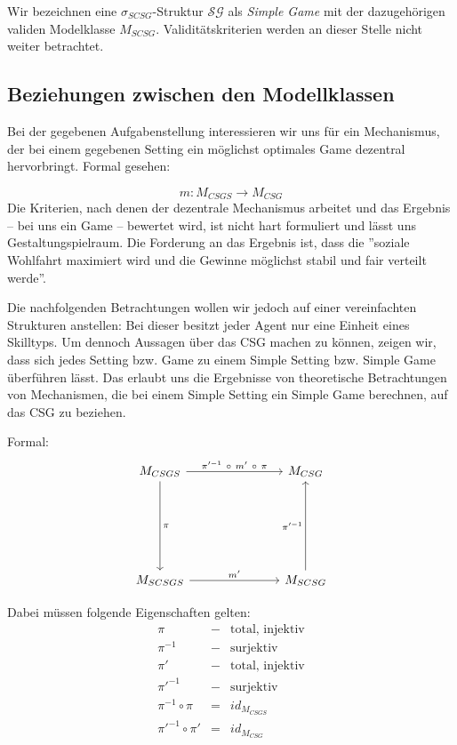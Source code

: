 \documentclass[sigconf]{acmart}
\theoremstyle{break}
\begin{document}
\noindent
Wir bezeichnen eine $\sigma_{SCSG}$-Struktur $\mathcal{SG}$ als \textit{Simple Game} mit der dazugehörigen validen Modelklasse $M_{SCSG}$. Validitätskriterien werden an dieser Stelle nicht weiter betrachtet.


\subsection{Beziehungen zwischen den Modellklassen}
\label{bez}
Bei der gegebenen Aufgabenstellung interessieren wir uns für ein Mechanismus, der bei einem gegebenen Setting ein möglichst optimales Game dezentral hervorbringt. Formal gesehen:

\begin{equation}
  m: M_{CSGS} \rightarrow M_{CSG}
\end{equation}
\noindent
Die Kriterien, nach denen der dezentrale Mechanismus arbeitet und das Ergebnis -- bei uns ein Game -- bewertet wird, ist nicht hart formuliert und lässt uns Gestaltungspielraum. Die Forderung an das Ergebnis ist, dass die ''soziale Wohlfahrt maximiert wird und die Gewinne möglichst stabil und fair verteilt werde''.

Die nachfolgenden Betrachtungen wollen wir jedoch auf einer vereinfachten Strukturen anstellen: Bei  dieser besitzt jeder Agent nur eine Einheit eines Skilltyps. Um dennoch Aussagen über das CSG machen zu können, zeigen wir, dass sich jedes Setting bzw. Game zu einem Simple Setting bzw. Simple Game überführen lässt. Das erlaubt uns die Ergebnisse von  theoretische Betrachtungen von Mechanismen, die bei einem Simple Setting ein Simple Game berechnen, auf das CSG zu beziehen.


\noindent
Formal:
\[
\begin{tikzcd}[column sep=1in,row sep=1in]
M_{CSGS} \arrow{d}{\pi} \arrow{r}{\pi'^{-1}\ \circ\  m'\ \circ\ \pi} & M_{CSG} \\
M_{SCSGS} \arrow{r}{m'} & M_{SCSG} \arrow{u}{\pi'^{-1}}
\end{tikzcd}
\]

\noindent
Dabei müssen folgende Eigenschaften gelten:
\begin{eqnarray}
  \pi &-&\text{total, injektiv} \\
  \pi^{-1}&-&\text{surjektiv} \\
  \pi' &-&\text{total, injektiv} \\
  \pi'^{-1}&-&\text{surjektiv} \\
  \pi^{-1}\circ\pi &=& id_{M_{CSGS}} \\
  \pi'^{-1}\circ\pi' &=& id_{M_{CSG}}
\end{eqnarray}
\end{document}
